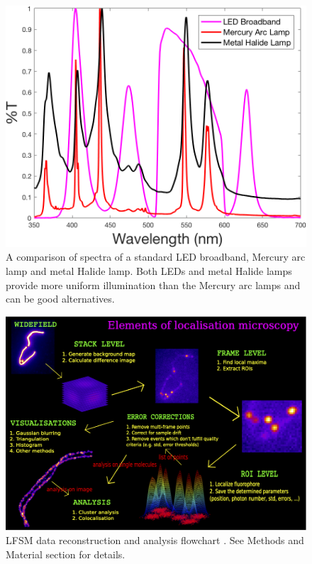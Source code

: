 \documentclass[9pt,twocolumn,twoside]{pnas-new}
\begin{document}
\begin{figure}
\begin{center}
\includegraphics[width=\linewidth]{Figures/SupFig3.png}
\end{center}
\caption[]{A comparison of spectra of a standard LED broadband, Mercury arc lamp and metal Halide lamp. Both LEDs and metal Halide lamps provide more uniform illumination than the Mercury arc lamps and can be good alternatives.} \label{fig:difflamps}
\end{figure}

\begin{figure}[h]
\begin{center}
\includegraphics[width=\linewidth]{Figures/SupFig4}
\caption[LFSM data reconstruction and analysis flowchart ]{LFSM data reconstruction and analysis flowchart \citep{prakash2016periodic}. See Methods and Material section for details.} \label{Fig:algo}
\end{center}
\end{figure}
\end{document}
